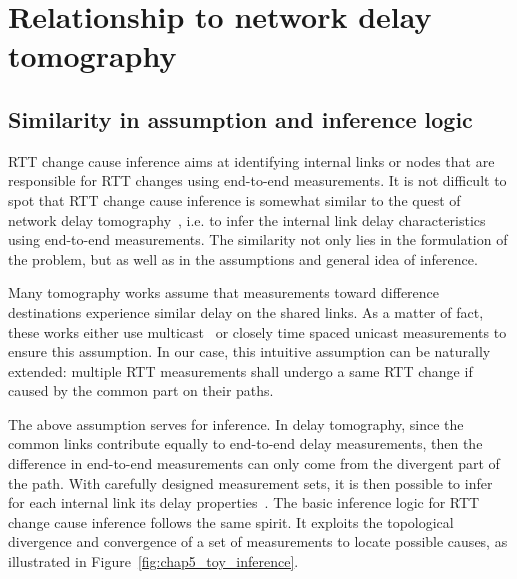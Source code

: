 \section{Relationship to network delay tomography}

\subsection{Similarity in assumption and inference logic}
RTT change cause inference aims at identifying internal links or nodes that are responsible for RTT changes using end-to-end measurements.
It is not difficult to spot that RTT change cause inference is somewhat similar to the quest of network delay tomography~\cite{Coates2002}, i.e. to infer the internal link delay characteristics using end-to-end measurements. The similarity not only lies in the formulation of the problem, but as well as in the assumptions and general idea of inference.

Many tomography works assume that measurements toward difference destinations experience similar delay on the shared links. As a matter of fact, these works either use multicast~\cite{LoPresti2002} or closely time spaced unicast measurements\cite{Shih2003,Tsang2003} to ensure this assumption. In our case, this intuitive assumption can be naturally extended: multiple RTT measurements shall undergo a same RTT change if caused by the common part on their paths.

The above assumption serves for inference. In delay tomography, since the common links contribute equally to end-to-end delay measurements, then the difference in end-to-end measurements can only come from the divergent part of the path. With carefully designed measurement sets, it is then possible to infer for each internal link its delay properties~\cite{Lawrence2006}.
The basic inference logic for RTT change cause inference follows the same spirit. It exploits the topological divergence and convergence of a set of measurements to locate possible causes, as illustrated in Figure~\ref{fig:chap5_toy_inference}.

